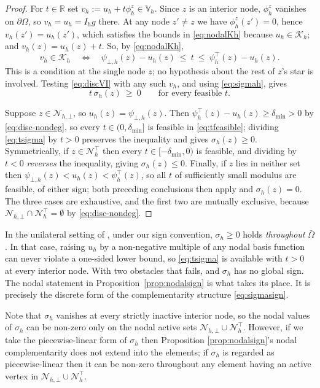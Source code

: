 \documentclass[12pt]{amsart}
\theoremstyle{definition}
\newcommand{\Om}{\Omega}
\newcommand{\dOm}{\partial\Omega}
\newcommand{\psiloh}{\psi_{\bot,h}}
\newcommand{\psiuph}{\psi^\top_h}
\newcommand{\Vh}{\mathbb{V}_h}
\newcommand{\Nh}{\mathcal{N}_h}
\newcommand{\Ih}{I_h}
\newcommand{\Kh}{\mathcal{K}_h}
\newcommand{\Nhbot}{\mathcal{N}_{h,\bot}}
\newcommand{\Nhtop}{\Nh^\top}
\begin{document}
\begin{proof}
For $t \in \mathbb{R}$ set $v_h := u_h + t \phi_h^z \in \Vh$.  Since $z$ is an interior node, $\phi_h^z$ vanishes on $\dOm$, so $v_h = u_h = \Ih g$ there.  At any node $z' \ne z$ we have $\phi_h^z(z') = 0$, hence $v_h(z') = u_h(z')$, which satisfies the bounds in \eqref{eq:nodalKh} because $u_h \in \Kh$; and $v_h(z) = u_h(z) + t$.  So, by \eqref{eq:nodalKh},
\begin{equation}
\label{eq:tfeasible}
  v_h \in \Kh \quad\iff\quad \psiloh(z) - u_h(z) \ \le\ t \ \le\ \psiuph(z) - u_h(z).
\end{equation}
This is a condition at the single node $z$; no hypothesis about the rest of $z$'s star is involved.  Testing \eqref{eq:discVI} with any such $v_h$, and using \eqref{eq:sigmah}, gives
\begin{equation}
\label{eq:tsigma}
  t\,\sigma_h(z) \ \ge\ 0 \qquad \text{for every feasible } t.
\end{equation}

Suppose $z \in \Nhbot$, so $u_h(z) = \psiloh(z)$.  Then $\psiuph(z) - u_h(z) \ge \delta_{\min} > 0$ by \eqref{eq:disc-nondeg}, so every $t \in (0,\delta_{\min}]$ is feasible in \eqref{eq:tfeasible}; dividing \eqref{eq:tsigma} by $t > 0$ preserves the inequality and gives $\sigma_h(z) \ge 0$.  Symmetrically, if $z \in \Nhtop$ then every $t \in [-\delta_{\min},0)$ is feasible, and dividing by $t < 0$ \emph{reverses} the inequality, giving $\sigma_h(z) \le 0$.  Finally, if $z$ lies in neither set then $\psiloh(z) < u_h(z) < \psiuph(z)$, so all $t$ of sufficiently small modulus are feasible, of either sign; both preceding conclusions then apply and $\sigma_h(z) = 0$.  The three cases are exhaustive, and the first two are mutually exclusive, because $\Nhbot \cap \Nhtop = \emptyset$ by \eqref{eq:disc-nondeg}.
\end{proof}

In the unilateral setting of \cite{NSV03}, under our sign convention, $\sigma_h \ge 0$ holds \emph{throughout} $\bar\Om$.  In that case, raising $u_h$ by a non-negative multiple of any nodal basis function can never violate a one-sided lower bound, so \eqref{eq:tsigma} is available with $t > 0$ at every interior node.  With two obstacles that fails, and $\sigma_h$ has no global sign.  The nodal statement in Proposition~\ref{prop:nodalsign} is what takes its place.  It is precisely the discrete form of the complementarity structure \eqref{eq:sigmasign}.

Note that $\sigma_h$ vanishes at every strictly inactive interior node, so the nodal values of $\sigma_h$ can be non-zero only on the nodal active sets $\Nhbot \cup \Nhtop$.  However, if we take the piecewise-linear form of $\sigma_h$ then Proposition \ref{prop:nodalsign}'s nodal complementarity does not extend into the elements; if $\sigma_h$ is regarded as piecewise-linear then it can be non-zero throughout any element having an active vertex in $\Nhbot \cup \Nhtop$.
\end{document}
